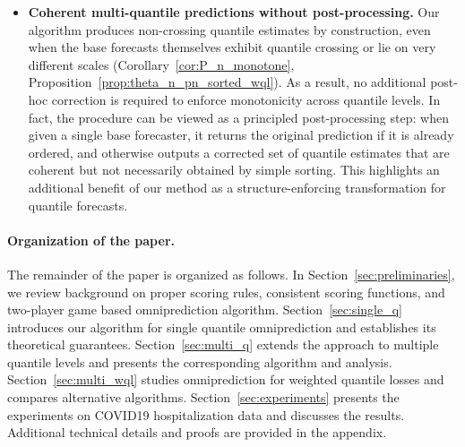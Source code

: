 \begin{itemize}
    \item \textbf{Coherent multi-quantile predictions without post-processing.}
    Our algorithm produces non-crossing quantile estimates by construction, even when the base forecasts themselves exhibit quantile crossing or lie on very different scales (Corollary~\ref{cor:P_n_monotone}, Proposition~\ref{prop:theta_n_pn_sorted_wql}). As a result, no additional post-hoc correction is required to enforce monotonicity across quantile levels. In fact, the procedure can be viewed as a principled post-processing step: when given a single base forecaster, it returns the original prediction if it is already ordered, and otherwise outputs a corrected set of quantile estimates that are coherent but not necessarily obtained by simple sorting. This highlights an additional benefit of our method as a structure-enforcing transformation for quantile forecasts.
\end{itemize}


\paragraph{Organization of the paper.}
The remainder of the paper is organized as follows. In Section~\ref{sec:preliminaries}, we review background on proper scoring rules, consistent scoring functions, and two-player game based omniprediction algorithm. Section~\ref{sec:single_q} introduces our algorithm for single quantile omniprediction and establishes its theoretical guarantees. Section~\ref{sec:multi_q} extends the approach to multiple quantile levels and presents the corresponding algorithm and analysis. Section~\ref{sec:multi_wql} studies omniprediction for weighted quantile losses and compares alternative algorithms. Section~\ref{sec:experiments} presents the experiments on COVID19 hospitalization data and discusses the results. Additional technical details and proofs are provided in the appendix.